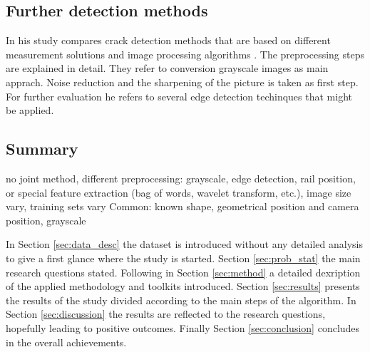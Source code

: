 \documentclass[10pt, final]{article}
\begin{document}
		\subsection{Further detection methods}
			In his study \citeauthor{kumar_m_survey_2018} compares crack detection methods that are based on different 
			measurement solutions and image processing algorithms \cite{kumar_m_survey_2018}.
			The preprocessing steps are explained in detail.
			They refer to conversion grayscale images as main apprach.
			Noise reduction and the sharpening of the picture is taken as first step.
			For further evaluation he refers to several edge detection techinques that might be applied.

		\subsection{Summary}
			no joint method, different preprocessing: grayscale, edge detection, rail position, or special feature extraction
			(bag of words, wavelet transform, etc.), image size vary, training sets vary
			Common: known shape, geometrical position and camera position, grayscale

			In Section \ref{sec:data_desc} the dataset is introduced without any detailed analysis
			to give a first glance where the study is started. 
			Section \ref{sec:prob_stat} the main research questions stated. 
			Following in Section \ref{sec:method} a detailed dexription of the applied methodology
			and toolkits introduced.
			Section \ref{sec:results} presents the results of the study divided according to 
			the main steps of the algorithm.
			In Section \ref{sec:discussion} the results are reflected to the research questions, 
			hopefully leading to positive outcomes.
			Finally Section \ref{sec:conclusion} concludes in the overall achievements.
\end{document}
